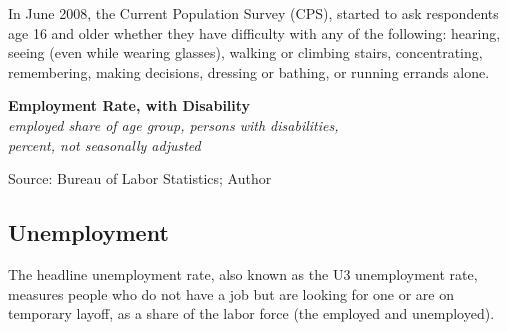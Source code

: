 \documentclass{report}
\makeatletter
\newcommand{\tbllink}[1]{\href{https://raw.githubusercontent.com/bdecon/US-chartbook/master/chartbook/data/#1}{\faTable}}
\newcommand*\short[1]{\expandafter\@gobbletwo\number\numexpr#1\relax}
\newcommand{\absnode}[3]{\node[below right, align=left] at (axis cs: #1,#2) {#3};}
\newcommand{\dateaxisticks}{
		date coordinates in=x, axis line style={draw=none},
		xmax={2023-10-01},
		max space between ticks=40,	    
		xtick={{1990-01-01}, {1992-01-01}, {1994-01-01}, 
			{1996-01-01}, {1998-01-01}, {2000-01-01}, 
			{2002-01-01}, {2004-01-01}, {2006-01-01},
			{2008-01-01}, {2010-01-01}, {2012-01-01}, {2014-01-01},
		    {2016-01-01}, {2018-01-01}, {2020-01-01}, {2022-01-01}, 
		    {2024-01-01}, {2026-01-01}},
		minor xtick={{1989-01-01}, {1991-01-01}, {1993-01-01},
			{1995-01-01}, {1997-01-01}, {1999-01-01}, 
			{2001-01-01}, {2003-01-01}, {2005-01-01}, {2007-01-01},
		    {2009-01-01}, {2011-01-01}, {2013-01-01}, {2015-01-01},
		    {2017-01-01}, {2019-01-01}, {2021-01-01}, {2023-01-01}, 
		    {2025-01-01}, {2027-01-01}},
		enlarge y limits={0.06}, enlarge x limits={0.01},
		}
\newcommand{\bbar}[2]{extra #1 ticks = {{#2}}, extra #1 tick labels = ,
		extra #1 tick style = {grid=major, grid style={thick, black!25}},}
\newcommand{\stdline}[4]{\addplot[very thick, no markers, color=#1] 
		table [x=#2, y=#3, col sep=comma] {#4};	}
\newcommand{\recbars}{
		\fill[color=black!10] (axis cs:{2007-12-01},\pgfkeysvalueof{/pgfplots/ymin}) rectangle 
			(axis cs:{2009-07-01}, \pgfkeysvalueof{/pgfplots/ymax});
		\fill[color=black!10] (axis cs:{2020-02-01},\pgfkeysvalueof{/pgfplots/ymin}) rectangle 
			(axis cs:{2020-05-01}, \pgfkeysvalueof{/pgfplots/ymax});}
\makeatother
\begin{document}
{\begin{minipage}{0.76\textwidth}
In June 2008, the Current Population Survey (CPS), started to ask respondents age 16 and older whether they have difficulty with any of the following: hearing, seeing (even while wearing glasses), walking or climbing stairs, concentrating, remembering, making decisions, dressing or bathing, or running errands alone.  
\end{minipage}

\begin{minipage}{0.43\textwidth} 
\normalsize \textbf{Employment Rate, with Disability}\\
\footnotesize{\textit{employed share of age group, persons with disabilities,}}\\
\footnotesize{\textit{percent, not seasonally adjusted}}
\vspace{5.6cm}

\hspace{4mm} 

\footnotesize{Source: Bureau of Labor Statistics; Author} \hfill \tbllink{dis_emp_rate_bls.csv} \ \ \tbllink{dis_emp_rate_cps.csv}
\end{minipage} \hspace{5mm}
\begin{minipage}{0.29\textwidth} 
\small  

 
\end{minipage}
\newpage
\vspace*{-10mm}

\begin{minipage}{0.76\textwidth} 
\subsection*{Unemployment}
\hypertarget{labu}{\label{labu}}
\vspace{-0.5mm}
\small The headline unemployment rate, also known as the U3 unemployment rate, measures people who do not have a job but are looking for one or are on temporary layoff, as a share of the labor force (the employed and unemployed). 
\end{minipage}

}
\end{document}
